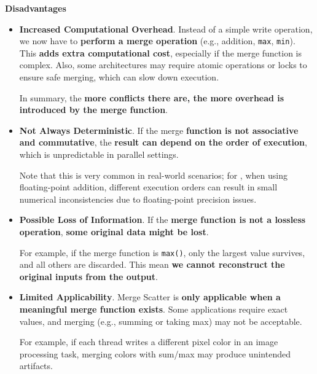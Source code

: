\highspace
\begin{flushleft}
    \textcolor{Red2}{ \textbf{Disadvantages}}
\end{flushleft}
\begin{itemize}[label=\textcolor{Red2}{}]
    \item \textcolor{Red2}{\textbf{Increased Computational Overhead}}. Instead of a simple write operation, we now have to \textbf{perform a merge operation} (e.g., addition, \texttt{max}, \texttt{min}). This \textbf{adds extra computational cost}, especially if the merge function is complex. Also, some architectures may require atomic operations or locks to ensure safe merging, which can slow down execution.

    In summary, the \textbf{more conflicts there are, the more overhead is introduced by the merge function}.

    \item \textcolor{Red2}{\textbf{Not Always Deterministic}}. If the merge \textbf{function is not associative and commutative}, the \textbf{result can depend on the order of execution}, which is unpredictable in parallel settings.
    
    Note that this is very common in real-world scenarios; for , when using floating-point addition, different execution orders can result in small numerical inconsistencies due to floating-point precision issues.
    
    \item \textcolor{Red2}{\textbf{Possible Loss of Information}}. If the \textbf{merge function is not a lossless operation}, \textbf{some original data might be lost}.
    
    \begin{examplebox}
        For example, if the merge function is \texttt{max()}, only the largest value survives, and all others are discarded. This mean \textbf{we cannot reconstruct the original inputs from the output}.
    \end{examplebox}
    
    \item \textcolor{Red2}{\textbf{Limited Applicability}}. Merge Scatter is \textbf{only applicable when a meaningful merge function exists}. Some applications require exact values, and merging (e.g., summing or taking max) may not be acceptable.
    
    \begin{examplebox}
        For example, if each thread writes a different pixel color in an image processing task, merging colors with sum/max may produce unintended artifacts.
    \end{examplebox}
\end{itemize}
